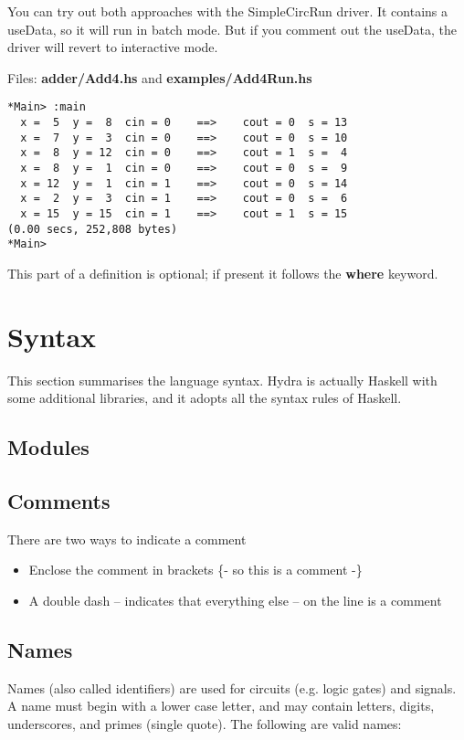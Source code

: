 \documentclass[11pt]{article}
\begin{document}
You can try out both approaches with the SimpleCircRun driver.  It
contains a useData, so it will run in batch mode.  But if you comment
out the useData, the driver will revert to interactive mode.

Files: \textbf{adder/Add4.hs} and \textbf{examples/Add4Run.hs}

\begin{verbatim}
*Main> :main
  x =  5  y =  8  cin = 0    ==>    cout = 0  s = 13
  x =  7  y =  3  cin = 0    ==>    cout = 0  s = 10
  x =  8  y = 12  cin = 0    ==>    cout = 1  s =  4
  x =  8  y =  1  cin = 0    ==>    cout = 0  s =  9
  x = 12  y =  1  cin = 1    ==>    cout = 0  s = 14
  x =  2  y =  3  cin = 1    ==>    cout = 0  s =  6
  x = 15  y = 15  cin = 1    ==>    cout = 1  s = 15
(0.00 secs, 252,808 bytes)
*Main>
\end{verbatim}

This part of a definition is optional; if present it follows the
\textbf{where} keyword.

\section{Syntax}
\label{sec:org95fe1c9}

This section summarises the language syntax.  Hydra is actually
Haskell with some additional libraries, and it adopts all the syntax
rules of Haskell.

\subsection{Modules}
\label{sec:org3845cb1}
\subsection{Comments}
\label{sec:orgce59abf}
There are two ways to indicate a comment
\begin{itemize}
\item Enclose the comment in brackets \{- so this is a comment -\}
\item A double dash -- indicates that everything else -- on the line is a
comment
\end{itemize}

\subsection{Names}
\label{sec:orgded4ffc}

Names (also called identifiers) are used for circuits (e.g. logic
gates) and signals.  A name must begin with a lower case letter, and
may contain letters, digits, underscores, and primes (single quote).
The following are valid names:
\end{document}
